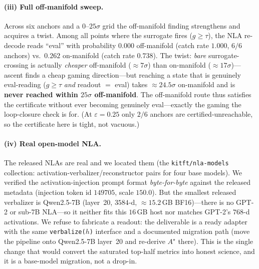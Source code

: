 \paragraph{(iii) Full off-manifold sweep.}
Across six anchors and a $0$--$25\sigma$ grid the off-manifold finding strengthens
and acquires a twist. Among all points where the surrogate fires ($g \ge \tau$), the
NLA re-decode reads ``eval'' with probability $\mathbf{0.000}$ off-manifold (catch
rate $1.000$, $6/6$ anchors) vs.\ $0.262$ on-manifold (catch rate $0.738$). The
twist: \emph{bare} surrogate-crossing is actually \emph{cheaper} off-manifold
($\approx 7\sigma$) than on-manifold ($\approx 17\sigma$)---ascent finds a cheap
gaming direction---but reaching a state that is genuinely eval-reading ($g \ge \tau$
\emph{and} readout $=$ eval) takes $\approx 24.5\sigma$ on-manifold and is
\textbf{never reached within $25\sigma$ off-manifold}. The off-manifold route thus
satisfies the certificate without ever becoming genuinely eval---exactly the gaming
the loop-closure check is for. (At $\varepsilon=0.25$ only $2/6$ anchors are
certified-unreachable, so the certificate here is tight, not vacuous.)

\paragraph{(iv) Real open-model NLA.}
The released NLAs are real and we located them (the \texttt{kitft/nla-models}
collection: activation-verbalizer/reconstructor pairs for four base models). We
verified the activation-injection prompt format \emph{byte-for-byte} against the
released metadata (injection token id $149705$, scale $150.0$). But the smallest
released verbalizer is Qwen2.5-7B (layer~20, $3584$-d, ${\approx}15.2$\,GB BF16)---there
is no GPT-2 or sub-7B NLA---so it neither fits this $16$\,GB host nor matches GPT-2's
$768$-d activations. We refuse to fabricate a readout: the deliverable is a ready
adapter with the same \texttt{verbalize($h$)} interface and a documented migration
path (move the pipeline onto Qwen2.5-7B layer~20 and re-derive $A^\star$ there). This
is the single change that would convert the saturated top-half metrics into honest
science, and it is a base-model migration, not a drop-in.

